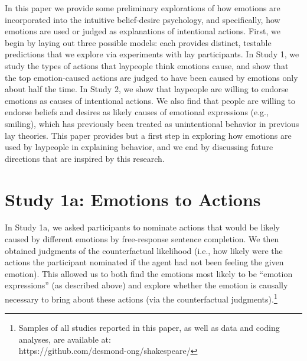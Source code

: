 \documentclass[10pt,letterpaper]{article}
\begin{document}
In this paper we provide some preliminary explorations of how emotions are incorporated into the intuitive belief-desire psychology, and specifically, how emotions are used or judged as explanations of intentional actions. First, we begin by laying out three possible models: each provides distinct, testable predictions that we explore via experiments with lay participants. In Study 1, we study the types of actions that laypeople think emotions cause, and show that the top emotion-caused actions are judged to have been caused by emotions only about half the time. In Study 2, we show that laypeople are willing to endorse emotions as causes of intentional actions. We also find that people are willing to endorse beliefs and desires as likely causes of emotional expressions (e.g., smiling), which has previously been treated as unintentional behavior in previous lay theories. This paper provides but a first step in exploring how emotions are used by laypeople in explaining behavior, and we end by discussing future directions that are inspired by this research.





\section{Study 1a: Emotions to Actions}

	In Study 1a, we asked participants to nominate actions that would be likely caused by different emotions by free-response sentence completion. 
	We then obtained judgments of the counterfactual likelihood (i.e., how likely were the actions the participant nominated if the agent had not been feeling the given emotion). 
	This allowed us to both find the emotions most likely to be ``emotion expressions'' (as described above) and explore whether the emotion is causally necessary to bring about these actions (via the counterfactual judgments).\footnote{Samples of all studies reported in this paper, as well as data and coding analyses, are available at: \\https://github.com/desmond-ong/shakespeare/}
\end{document}
